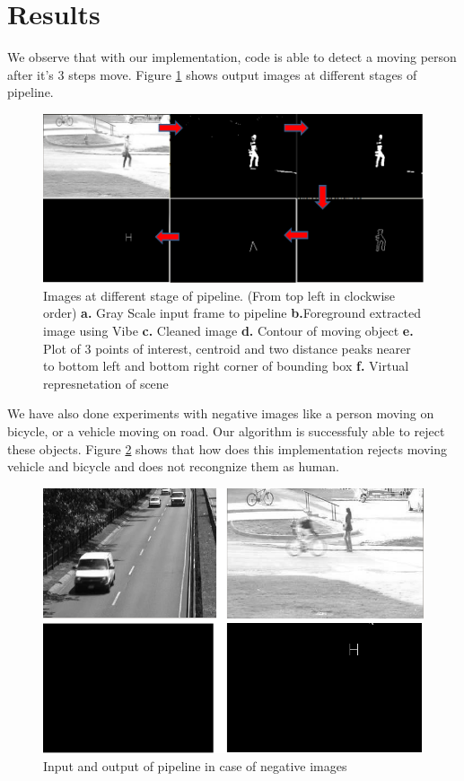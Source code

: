 \documentclass[conference]{IEEEtran}
\begin{document}
\section{Results}
We observe that with our implementation, code is able to detect a moving
person after it's 3 steps move. Figure  \ref{pipeline_images} shows
output images at different stages of pipeline.

\begin{figure}[!h]
\centering
\includegraphics[scale=0.30]{figures/pipeline_images}
\caption{Images at different stage of pipeline. (From top left in
clockwise order) \textbf{a.} Gray Scale input frame to pipeline
\textbf{b.}Foreground extracted image using Vibe \textbf{c.} Cleaned
image \textbf{d.} Contour of moving object \textbf{e.} Plot of 3 points
of interest, centroid and two distance peaks nearer to bottom left and
bottom right corner of bounding box \textbf{f.} Virtual represnetation
of scene} 
\label{pipeline_images}
\end{figure}

We have also done experiments with negative images like a person moving
on bicycle, or a vehicle moving on road. Our algorithm is successfuly
able to reject these objects. Figure \ref{negative_inputs} shows that
how does this implementation rejects moving vehicle and bicycle and  does
not recongnize them as human.
\begin{figure}[!h]
\centering
\includegraphics[scale=0.30]{figures/negative_inputs}
\caption{Input and output of pipeline in case of negative images}
\label{negative_inputs}
\end{figure}
\end{document}
